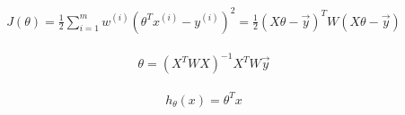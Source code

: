 \documentclass[12pt]{article}
\begin{document}
\begin{align*}
  J(\theta) = \frac{1}{2}\sum_{i=1}^{m}{
                w^{(i)}\left(\theta^T x^{(i)} - y^{(i)}\right)^2
              }
            = \frac{1}{2}(X\theta - \vec{y})^T W(X\theta - \vec{y})
\end{align*}

\begin{align*}
  \theta = (X^T W X)^{-1} X^T W \vec{y}
\end{align*}


\begin{align*}
  h_{\theta}(x) = \theta^T x
\end{align*}
\end{document}
